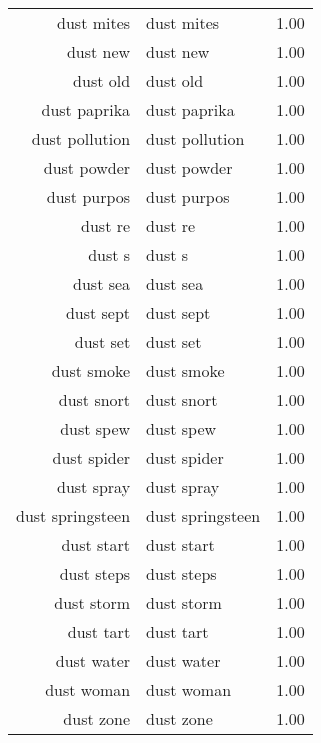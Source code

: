 \begin{table}[ht]
\begin{tabular}{rlr}
  dust mites & dust mites & 1.00 \\ 
  dust new & dust new & 1.00 \\ 
  dust old & dust old & 1.00 \\ 
  dust paprika & dust paprika & 1.00 \\ 
  dust pollution & dust pollution & 1.00 \\ 
  dust powder & dust powder & 1.00 \\ 
  dust purpos & dust purpos & 1.00 \\ 
  dust re & dust re & 1.00 \\ 
  dust s & dust s & 1.00 \\ 
  dust sea & dust sea & 1.00 \\ 
  dust sept & dust sept & 1.00 \\ 
  dust set & dust set & 1.00 \\ 
  dust smoke & dust smoke & 1.00 \\ 
  dust snort & dust snort & 1.00 \\ 
  dust spew & dust spew & 1.00 \\ 
  dust spider & dust spider & 1.00 \\ 
  dust spray & dust spray & 1.00 \\ 
  dust springsteen & dust springsteen & 1.00 \\ 
  dust start & dust start & 1.00 \\ 
  dust steps & dust steps & 1.00 \\ 
  dust storm & dust storm & 1.00 \\ 
  dust tart & dust tart & 1.00 \\ 
  dust water & dust water & 1.00 \\ 
  dust woman & dust woman & 1.00 \\ 
  dust zone & dust zone & 1.00 \\ 
   \hline
\end{tabular}
\end{table}
